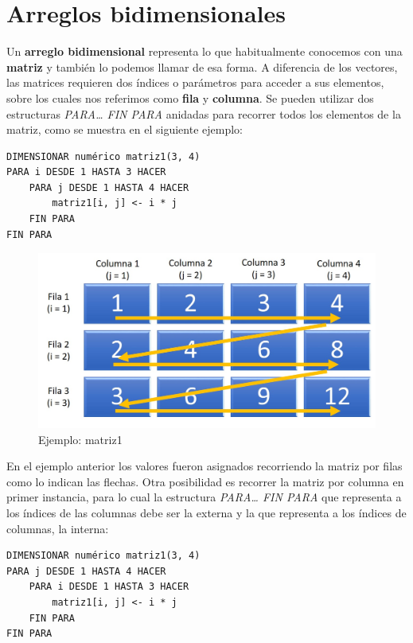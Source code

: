 \documentclass[]{book}
\begin{document}
\hypertarget{arreglos-bidimensionales}{%
\section{Arreglos bidimensionales}\label{arreglos-bidimensionales}}

Un \textbf{arreglo bidimensional} representa lo que habitualmente conocemos con una \textbf{matriz} y también lo podemos llamar de esa forma. A diferencia de los vectores, las matrices requieren dos índices o parámetros para acceder a sus elementos, sobre los cuales nos referimos como \textbf{fila} y \textbf{columna}. Se pueden utilizar dos estructuras \emph{PARA\ldots{} FIN PARA} anidadas para recorrer todos los elementos de la matriz, como se muestra en el siguiente ejemplo:

\begin{verbatim}
DIMENSIONAR numérico matriz1(3, 4)
PARA i DESDE 1 HASTA 3 HACER
    PARA j DESDE 1 HASTA 4 HACER
        matriz1[i, j] <- i * j
    FIN PARA
FIN PARA
\end{verbatim}

\begin{figure}

{\centering \includegraphics[width=0.8\linewidth]{images/13_matriz1} 

}

\caption{Ejemplo: matriz1}\label{fig:matriz1}
\end{figure}

En el ejemplo anterior los valores fueron asignados recorriendo la matriz por filas como lo indican las flechas. Otra posibilidad es recorrer la matriz por columna en primer instancia, para lo cual la estructura \emph{PARA\ldots{} FIN PARA} que representa a los índices de las columnas debe ser la externa y la que representa a los índices de columnas, la interna:

\begin{verbatim}
DIMENSIONAR numérico matriz1(3, 4)
PARA j DESDE 1 HASTA 4 HACER
    PARA i DESDE 1 HASTA 3 HACER
        matriz1[i, j] <- i * j
    FIN PARA
FIN PARA
\end{verbatim}
\end{document}
